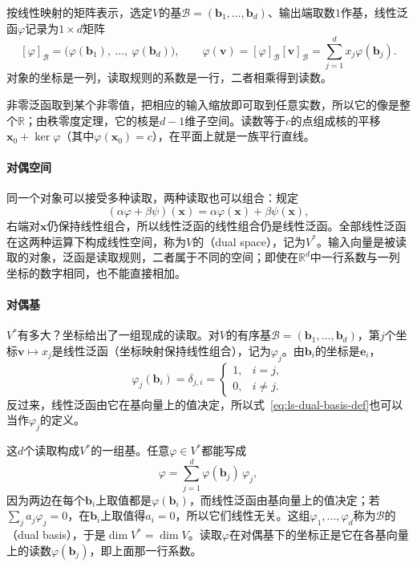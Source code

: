 按线性映射的矩阵表示，选定$V$的基$\mathcal B=(\bm b_1,\ldots,\bm b_d)$、输出端取数$1$作基，线性泛函$\varphi$记录为$1\times d$矩阵
\[
 [\varphi]_{\mathcal B}=\bigl(\varphi(\bm b_1),\ \ldots,\ \varphi(\bm b_d)\bigr),
 \qquad
 \varphi(\bm v)=[\varphi]_{\mathcal B}[\bm v]_{\mathcal B}=\sum_{j=1}^dx_j\varphi(\bm b_j).
\]
对象的坐标是一列，读取规则的系数是一行，二者相乘得到读数。

非零泛函取到某个非零值，把相应的输入缩放即可取到任意实数，所以它的像是整个$\mathbb R$；由秩零度定理，它的核是$d-1$维子空间。读数等于$c$的点组成核的平移$\bm x_0+\ker\varphi$（其中$\varphi(\bm x_0)=c$），在平面上就是一族平行直线。

\paragraph{对偶空间}
同一个对象可以接受多种读取，两种读取也可以组合：规定
\[
 (\alpha\varphi+\beta\psi)(\bm x)=\alpha\varphi(\bm x)+\beta\psi(\bm x),
\]
右端对$\bm x$仍保持线性组合，所以线性泛函的线性组合仍是线性泛函。全部线性泛函在这两种运算下构成线性空间，称为$V$的（dual space），记为$V^*$。输入向量是被读取的对象，泛函是读取规则，二者属于不同的空间；即使在$\mathbb R^d$中一行系数与一列坐标的数字相同，也不能直接相加。

\paragraph{对偶基}
$V^*$有多大？坐标给出了一组现成的读取。对$V$的有序基$\mathcal B=(\bm b_1,\ldots,\bm b_d)$，第$j$个坐标$\bm v\mapsto x_j$是线性泛函（坐标映射保持线性组合），记为$\varphi_j$。由$\bm b_i$的坐标是$\bm e_i$，
\begin{equation}
 \varphi_j(\bm b_i)=\delta_{j,i}
 =\begin{cases}1,&i=j,\\0,&i\neq j.\end{cases}
 \label{eq:ls-dual-basis-def}
\end{equation}
反过来，线性泛函由它在基向量上的值决定，所以式~\eqref{eq:ls-dual-basis-def}也可以当作$\varphi_j$的定义。

这$d$个读取构成$V^*$的一组基。任意$\varphi\in V^*$都能写成
\[
 \varphi=\sum_{j=1}^d\varphi(\bm b_j)\,\varphi_j,
\]
因为两边在每个$\bm b_i$上取值都是$\varphi(\bm b_i)$，而线性泛函由基向量上的值决定；若$\sum_ja_j\varphi_j=0$，在$\bm b_i$上取值得$a_i=0$，所以它们线性无关。这组$\varphi_1,\ldots,\varphi_d$称为$\mathcal B$的（dual basis），于是$\dim V^*=\dim V$。读取$\varphi$在对偶基下的坐标正是它在各基向量上的读数$\varphi(\bm b_j)$，即上面那一行系数。

